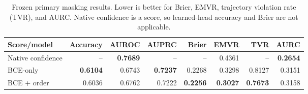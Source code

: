 \begin{table}[t]
\centering
\caption{Frozen primary masking results. Lower is better for Brier, EMVR, trajectory violation rate (TVR), and AURC. Native confidence is a score, so learned-head accuracy and Brier are not applicable.}
\label{tab:masking}
\small
\begin{tabular}{lrrrrrrr}
\toprule
Score/model & Accuracy & AUROC & AUPRC & Brier & EMVR & TVR & AURC \\
\midrule
Native confidence & -- & \textbf{0.7689} & -- & -- & 0.4361 & -- & \textbf{0.2654} \\
BCE-only & \textbf{0.6104} & 0.6743 & \textbf{0.7237} & 0.2268 & 0.3298 & 0.8127 & 0.3151 \\
BCE + order & 0.6036 & 0.6762 & 0.7222 & \textbf{0.2256} & \textbf{0.3027} & \textbf{0.7673} & 0.3158 \\
\bottomrule
\end{tabular}
\end{table}
